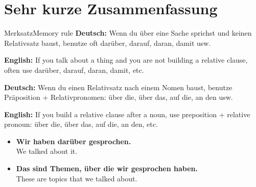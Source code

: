 \documentclass[a4paper,11pt]{article}
\newcommand{\GermanText}[1]{\textbf{Deutsch: }#1\par}
\newcommand{\EnglishText}[1]{{\small\color{SoftGray}\textbf{English: }#1\par}}
\newcommand{\ExampleItem}[2]{\item \textbf{#1}\\{\small\color{SoftGray}#2}}
\begin{document}
    
    \section{Sehr kurze Zusammenfassung}
        
        \begin{grammarentry}{Merksatz}{Memory rule}
            \GermanText{Wenn du über eine Sache sprichst und keinen Relativsatz baust, benutze oft darüber, darauf, daran, damit usw.}
            \EnglishText{If you talk about a thing and you are not building a relative clause, often use darüber, darauf, daran, damit, etc.}
            
            \GermanText{Wenn du einen Relativsatz nach einem Nomen baust, benutze Präposition + Relativpronomen: über die, über das, auf die, an den usw.}
            \EnglishText{If you build a relative clause after a noun, use preposition + relative pronoun: über die, über das, auf die, an den, etc.}
            
            \begin{exbox}
                \begin{itemize}
                    \ExampleItem{Wir haben darüber gesprochen.}{We talked about it.}
                    \ExampleItem{Das sind Themen, über die wir gesprochen haben.}{These are topics that we talked about.}
                \end{itemize}
            \end{exbox}
        \end{grammarentry}
\end{document}
